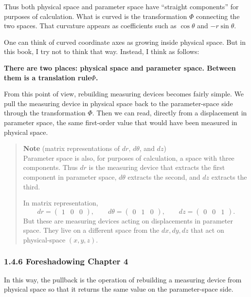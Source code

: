 \documentclass[a4paper,12pt,openany]{book}
\begin{document}
Thus both physical space and parameter space have ``straight
components'' for purposes of calculation. What is curved is the
transformation \(\Phi\) connecting the two spaces. That curvature
appears as coefficients such as \(\cos\theta\) and \(-r\sin\theta\).

One can think of curved coordinate axes as growing inside physical
space. But in this book, I try not to think that way. Instead, I think
as follows:

\textbf{There are two places: physical space and parameter space. Between them is a translation rule}\(\Phi\)\textbf{.}

From this point of view, rebuilding measuring devices becomes fairly
simple. We pull the measuring device in physical space back to the
parameter-space side through the transformation \(\Phi\). Then we can
read, directly from a displacement in parameter space, the same
first-order value that would have been measured in physical space.

\begin{quote}
\textbf{Note} (matrix representations of \(dr\), \(d\theta\), and
\(dz\))\\
Parameter space is also, for purposes of calculation, a space with three
components. Thus \(dr\) is the measuring device that extracts the first
component in parameter space, \(d\theta\) extracts the second, and
\(dz\) extracts the third.

In matrix representation, \[
dr=\begin{pmatrix}1&0&0\end{pmatrix},\qquad
d\theta=\begin{pmatrix}0&1&0\end{pmatrix},\qquad
dz=\begin{pmatrix}0&0&1\end{pmatrix}.
\] But these are measuring devices acting on displacements in parameter
space. They live on a different space from the \(dx,dy,dz\) that act on
physical-space \((x,y,z)\).
\end{quote}

\hypertarget{foreshadowing-chapter-4}{%
\subsubsection{1.4.6 Foreshadowing Chapter
4}\label{foreshadowing-chapter-4}}

In this way, the pullback is the operation of rebuilding a measuring
device from physical space so that it returns the same value on the
parameter-space side.
\end{document}
